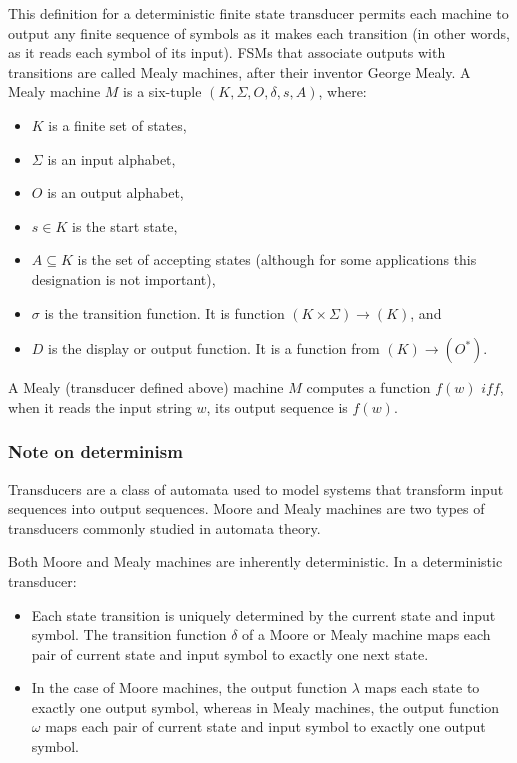 \documentclass[hidelinks,12pt]{article}
\begin{document}
This definition for a deterministic finite state transducer permits each
machine to output any finite sequence of symbols as it makes each transition
(in other words, as it reads each symbol of its input).  FSMs that associate
outputs with transitions are called Mealy machines, after their inventor George
Mealy.  A Mealy machine $M$ is a six-tuple $(K, \Sigma, O, \delta, s, A)$, where: 

\begin{itemize}
    \item $K$ is a finite set of states,
    \item $\Sigma$ is an input alphabet,
    \item $O$ is an output alphabet,
    \item $s \in K$ is the start state,
    \item $A \subseteq K $ is the set of accepting states (although for some applications this designation is not important),
    \item $\sigma$ is the transition function. It is function $(K \times \Sigma) \to (K)$, and
    \item $D$ is the display or output function. It is a function from $(K) \to (O^*)$.
\end{itemize}

A Mealy (transducer defined above) machine $M$ computes a function $f(w)$ $
iff$, when it reads the input string $w$, its output sequence is $f(w)$. 

\subsubsection{Note on determinism}

Transducers are a class of automata used to model systems that transform input
sequences into output sequences. Moore and Mealy machines are two types of
transducers commonly studied in automata theory.

Both Moore and Mealy machines are inherently deterministic. In a deterministic
transducer:

\begin{itemize}
  \item Each state transition is uniquely determined by the current state and input symbol. The transition function $\delta$ of a Moore or Mealy machine maps each pair of current state and input symbol to exactly one next state.
  \item In the case of Moore machines, the output function $\lambda$ maps each state to exactly one output symbol, whereas in Mealy machines, the output function $\omega$ maps each pair of current state and input symbol to exactly one output symbol.
\end{itemize}
\end{document}
